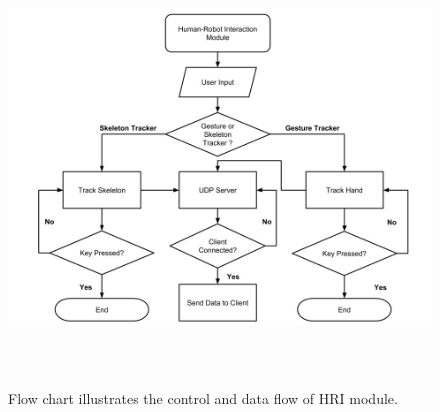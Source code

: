 \begin{figure}
	[h] \centering 
	\includegraphics[height=115mm]{figures/content/hri-flow.jpg} \caption{Flow chart illustrates the control and data flow of HRI module. } \label{fg:hri:flow} 
\end{figure}
